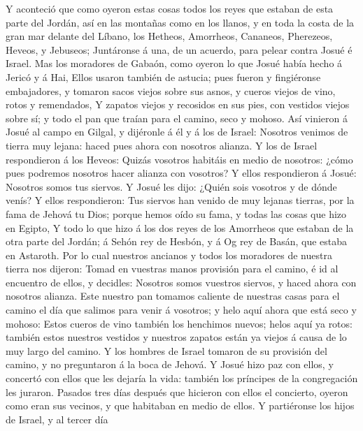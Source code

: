  Y aconteció que como oyeron estas cosas todos los reyes que
estaban de esta parte del Jordán, así en las montañas como en los
llanos, y en toda la costa de la gran mar delante del Líbano, los
Hetheos, Amorrheos, Cananeos, Pherezeos, Heveos, y Jebuseos;
 Juntáronse á una, de un acuerdo, para pelear contra Josué é
Israel.  Mas los moradores de Gabaón, como oyeron lo que
Josué había hecho á Jericó y á Hai,  Ellos usaron también de
astucia; pues fueron y fingiéronse embajadores, y tomaron sacos viejos
sobre sus asnos, y cueros viejos de vino, rotos y remendados,
 Y zapatos viejos y recosidos en sus pies, con vestidos
viejos sobre sí; y todo el pan que traían para el camino, seco y mohoso.
 Así vinieron á Josué al campo en Gilgal, y dijéronle á él y
á los de Israel: Nosotros venimos de tierra muy lejana: haced pues ahora
con nosotros alianza.  Y los de Israel respondieron á los
Heveos: Quizás vosotros habitáis en medio de nosotros: ¿cómo pues
podremos nosotros hacer alianza con vosotros?  Y ellos
respondieron á Josué: Nosotros somos tus siervos. Y Josué les dijo:
¿Quién sois vosotros y de dónde venís?  Y ellos
respondieron: Tus siervos han venido de muy lejanas tierras, por la fama
de Jehová tu Dios; porque hemos oído su fama, y todas las cosas que hizo
en Egipto,  Y todo lo que hizo á los dos reyes de los
Amorrheos que estaban de la otra parte del Jordán; á Sehón rey de
Hesbón, y á Og rey de Basán, que estaba en Astaroth.  Por
lo cual nuestros ancianos y todos los moradores de nuestra tierra nos
dijeron: Tomad en vuestras manos provisión para el camino, é id al
encuentro de ellos, y decidles: Nosotros somos vuestros siervos, y haced
ahora con nosotros alianza.  Este nuestro pan tomamos
caliente de nuestras casas para el camino el día que salimos para venir
á vosotros; y helo aquí ahora que está seco y mohoso: 
Estos cueros de vino también los henchimos nuevos; helos aquí ya rotos:
también estos nuestros vestidos y nuestros zapatos están ya viejos á
causa de lo muy largo del camino.  Y los hombres de Israel
tomaron de su provisión del camino, y no preguntaron á la boca de
Jehová.  Y Josué hizo paz con ellos, y concertó con ellos
que les dejaría la vida: también los príncipes de la congregación les
juraron.  Pasados tres días después que hicieron con ellos
el concierto, oyeron como eran sus vecinos, y que habitaban en medio de
ellos.  Y partiéronse los hijos de Israel, y al tercer día
